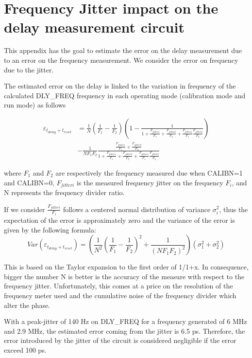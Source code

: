 
\chapter{Frequency Jitter impact on the delay measurement circuit}
\label{app:delay_circuit_jitter}
This appendix has the goal to estimate the error on the delay measurement due to an error on the frequency measurement. We consider the error on frequency due to the jitter.

The estimated error on the delay is linked to the variation in frequency of the calculated DLY\_FREQ frequency in each operating mode (calibration mode and run mode) as follows

\begin{align}
\varepsilon_{t_{delay}+t_{reset}} &= \frac{1}{N} \left(\frac{1}{F_1}-\frac{1}{F_2} \right) \left(1 - \frac{1}{1+\frac{F_{jitter1}}{F_1}+\frac{F_{jitter2}}{F_2}+\frac{F_{jitter1}}{F_1}\frac{F_{jitter2}}{F_2}} \right) \\
&- \frac{1}{NF_1 F_2} \frac{\frac{F_{jitter1}}{F_1}+\frac{F_{jitter2}}{F_2}}{1+\frac{F_{jitter1}}{F_1}+\frac{F_{jitter2}}{F_2}+\frac{F_{jitter1}}{F_1}\frac{F_{jitter2}}{F_2}} \nonumber
\end{align}

where $F_1$ and $F_2$ are respectively the frequency measured due when CALIBN=1 and CALIBN=0, $F_{jitteri}$ is the measured frequency jitter on the frequency $F_i$, and N represents the frequency divider ratio.

If we consider $\frac{F_{jitteri}}{F_i}$ follows a centered normal distribution of variance $\sigma_i^2$, thus the expectation of the error is approximately zero and the variance of the error is given by the following formula:
\begin{equation}
Var\left(\varepsilon_{t_{delay}+t_{reset}}\right) = \left(\frac{1}{N^2} \left(\frac{1}{F_1}-\frac{1}{F_2} \right)^2 + \frac{1}{\left(NF_1F_2\right)^2} \right) \left(\sigma_1^2+\sigma_2^2 \right)
\end{equation}

This is based on the Taylor expansion to the first order of 1/1+x. In consequence, bigger the number N is better is the accuracy of the measure with respect to the frequency jitter. Unfortunately, this comes at a price on the resolution of the frequency meter used and the cumulative noise of the frequency divider which alter the phase.

With a peak-jitter of 140 Hz on DLY\_FREQ for a frequency generated of 6 MHz and 2.9 MHz, the estimated error coming from the jitter is 6.5 ps. Therefore, the error introduced by the jitter of the circuit is considered negligible if the error exceed 100 ps.

